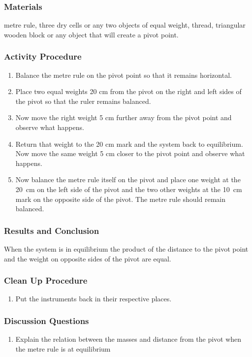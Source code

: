 \subsubsection*{Materials}
metre rule, three dry cells or any two objects of equal weight, thread, triangular wooden block or any object that will create a pivot point.  


\subsubsection*{Activity Procedure}
\begin{enumerate}
\item{Balance the metre rule on the pivot point so that it remains horizontal.} 
\item{Place two equal weights 20 cm from the pivot on the right and left sides of the pivot so that the ruler remains balanced.} 
\item{Now move the right weight 5 cm further away from the pivot point and observe what happens.} 
\item{Return that weight to the 20 cm mark and the system back to equilibrium. Now move the same weight 5 cm closer to the pivot point and observe what happens.} 
\item{Now balance the metre rule itself on the pivot and place one weight at the 20~cm on the left side of the pivot and the two other weights at the 10~cm mark on the opposite side of the pivot. The metre rule should remain balanced.} 
\end{enumerate}

\subsubsection*{Results and Conclusion}
When the system is in equilibrium the product of the distance to the pivot point and the weight on opposite sides of the pivot are equal.  

\subsubsection*{Clean Up Procedure}
\begin{enumerate}
\item{Put the instruments back in their respective places.} 
\end{enumerate}

\subsubsection*{Discussion Questions}
\begin{enumerate}
\item{Explain the relation between the masses and distance from the pivot when the metre rule is at equilibrium}
\end{enumerate}

